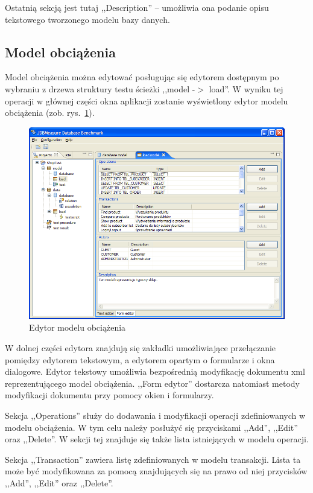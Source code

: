 Ostatnią sekcją jest tutaj ,,Description'' -- umożliwia ona podanie opisu tekstowego tworzonego modelu bazy danych.

\subsection{Model obciążenia}
Model obciążenia można edytować posługując się edytorem dostępnym po wybraniu z
drzewa struktury testu ścieżki ,,model -$>$ load''. W wyniku tej operacji w
głównej części okna aplikacji zostanie wyświetlony edytor modelu obciążenia (zob. rys.~\ref{rys:loadedytor}).
\begin{figure}[h]
\begin{center}
\includegraphics[width=0.9\linewidth]{figures/gui/14.png}
\end{center}
\caption{Edytor modelu obciążenia}\label{rys:loadedytor}
\end{figure}
W dolnej części edytora znajdują się zakładki umożliwiające przełączanie
pomiędzy edytorem tekstowym, a edytorem opartym o formularze i okna dialogowe.
Edytor tekstowy umożliwia bezpośrednią modyfikację dokumentu xml reprezentującego model obciążenia.
,,Form edytor'' dostarcza natomiast metody modyfikacji dokumentu przy pomocy okien i formularzy.

Sekcja ,,Operations'' służy do dodawania i modyfikacji operacji zdefiniowanych w modelu obciążenia.
W tym celu należy posłużyć się przyciskami ,,Add'', ,,Edit'' oraz ,,Delete''.
W sekcji tej znajduje się także lista istniejących w modelu operacji.

Sekcja ,,Transaction'' zawiera listę zdefiniowanych w modelu transakcji. Lista ta może być modyfikowana
za pomocą znajdujących się na prawo od niej przycisków  ,,Add'', ,,Edit'' oraz ,,Delete''.

